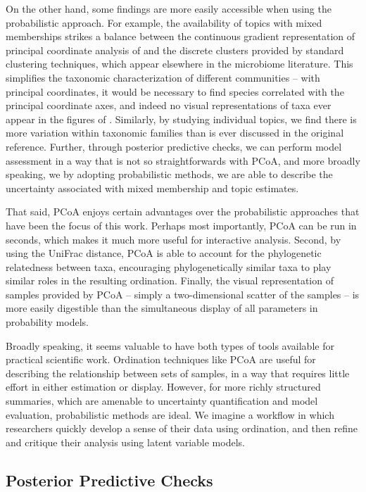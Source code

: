On the other hand, some findings are more easily accessible when using the
probabilistic approach. For example, the availability of topics with mixed
memberships strikes a balance between the continuous gradient representation of
principal coordinate analysis of \citep{dethlefsen2011incomplete} and the
discrete clusters provided by standard clustering techniques, which appear
elsewhere in the microbiome literature. This simplifies the taxonomic
characterization of different communities -- with principal coordinates, it
would be necessary to find species correlated with the principal coordinate
axes, and indeed no visual representations of taxa ever appear in the figures of
\cite{dethlefsen2011incomplete}. Similarly, by studying individual topics, we
find there is more variation within taxonomic families than is ever discussed in
the original reference. Further, through posterior predictive checks, we can
perform model assessment in a way that is not so straightforwards with PCoA, and
more broadly speaking, we by adopting probabilistic methods, we are able to
describe the uncertainty associated with mixed membership and topic estimates.

That said, PCoA enjoys certain advantages over the probabilistic approaches that
have been the focus of this work. Perhaps most importantly, PCoA can be run in
seconds, which makes it much more useful for interactive analysis. Second, by
using the UniFrac distance, PCoA is able to account for the phylogenetic
relatedness between taxa, encouraging phylogenetically similar taxa to play
similar roles in the resulting ordination. Finally, the visual representation of
samples provided by PCoA -- simply a two-dimensional scatter of the samples --
is more easily digestible than the simultaneous display of all parameters in
probability models.

Broadly speaking, it seems valuable to have both types of tools available for
practical scientific work. Ordination techniques like PCoA are useful for
describing the relationship between sets of samples, in a way that requires
little effort in either estimation or display. However, for more richly
structured summaries, which are amenable to uncertainty quantification and model
evaluation, probabilistic methods are ideal. We imagine a workflow in which
researchers quickly develop a sense of their data using ordination, and then
refine and critique their analysis using latent variable models.

\subsection{Posterior Predictive Checks}
\label{sec:antibiotics_ppc}

